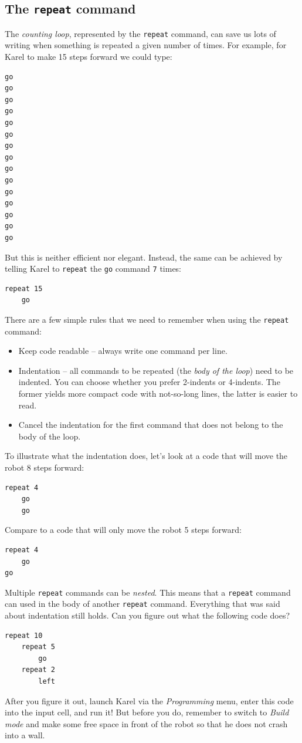 {{\subsection{The {\tt repeat} command}

The {\em counting loop}, represented by the {\tt repeat} command, can save 
us lots of writing when something is repeated a given number of times. 
For example, for Karel to make 15 steps forward we could type:

\begin{verbatim}
go
go
go
go
go
go
go
go
go
go
go
go
go
go
go
\end{verbatim}
But this is neither efficient nor elegant. Instead, the same can be
achieved by telling Karel to {\tt repeat} the {\tt go} command {\tt 7} times:

\begin{verbatim}
repeat 15
    go
\end{verbatim}
There are a few simple rules that we need to remember when using the {\tt repeat} command:

\begin{itemize}
\item Keep code readable -- always write one command per line.
\item Indentation -- all commands to be repeated (the {\em body of the loop}) need to be indented. You can
      choose whether you prefer 2-indents or 4-indents. The former yields more compact 
      code with not-so-long lines, the latter is easier to read. 
\item Cancel the indentation for the first command that does not belong to the body of the loop.
\end{itemize}
To illustrate what the indentation does, let's look at a code that will move the robot 8 steps forward:

\begin{verbatim}
repeat 4
    go
    go
\end{verbatim}
Compare to a code that will only move the robot 5 steps forward:

\begin{verbatim}
repeat 4
    go
go
\end{verbatim}
Multiple {\tt repeat} commands can be {\em nested}. This means that a {\tt repeat} command 
can used in the body of another {\tt repeat} command. Everything that was said about indentation 
still holds. Can you figure out what the following code does?

\begin{verbatim}
repeat 10
    repeat 5
        go
    repeat 2
        left
\end{verbatim}
After you figure it out, launch Karel via the {\em Programming} menu, enter this code into
the input cell, and run it! But before you do, remember to switch to {\em Build mode} and make 
some free space in front of the robot 
so that he does not crash into a wall.

}}
